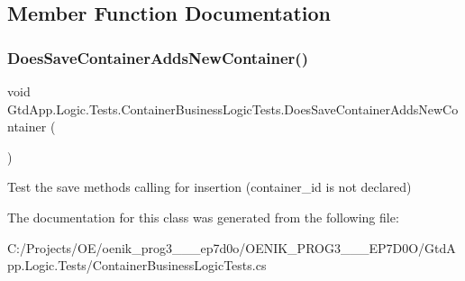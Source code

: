\subsection{Member Function Documentation}
\mbox{\label{class_gtd_app_1_1_logic_1_1_tests_1_1_container_business_logic_tests_a51e46256b82148f9a33a616daa5b551c}} 
\subsubsection{\texorpdfstring{Does\+Save\+Container\+Adds\+New\+Container()}{DoesSaveContainerAddsNewContainer()}}
{\footnotesize\ttfamily void Gtd\+App.\+Logic.\+Tests.\+Container\+Business\+Logic\+Tests.\+Does\+Save\+Container\+Adds\+New\+Container (\begin{DoxyParamCaption}{ }\end{DoxyParamCaption})}



Test the save method\textquotesingle{}s calling for insertion (container\+\_\+id is not declared) 



The documentation for this class was generated from the following file\+:\begin{DoxyCompactItemize}
\item 
C\+:/\+Projects/\+O\+E/oenik\+\_\+prog3\+\_\+\_\+\_\+ep7d0o/\+O\+E\+N\+I\+K\+\_\+\+P\+R\+O\+G3\+\_\+\_\+\_\+\+E\+P7\+D0\+O/\+Gtd\+App.\+Logic.\+Tests/Container\+Business\+Logic\+Tests.\+cs\end{DoxyCompactItemize}
